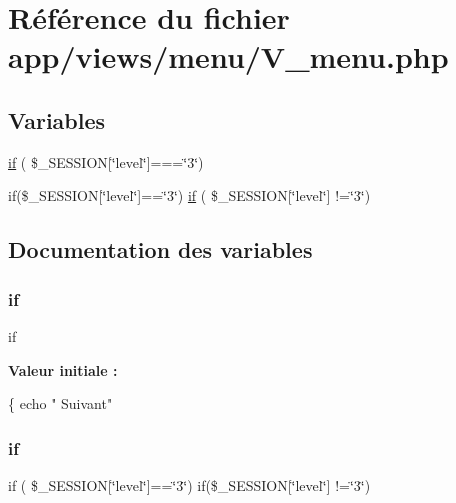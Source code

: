 \hypertarget{_v__menu_8php}{}\section{Référence du fichier app/views/menu/\+V\+\_\+menu.php}
\label{_v__menu_8php}
\subsection*{Variables}
\begin{DoxyCompactItemize}
\item 
\hyperlink{_v__menu_8php_aed100f8bb87599a4d812d99aee7072e0}{if} ( \$\+\_\+\+S\+E\+S\+S\+I\+ON\mbox{[}\char`\"{}level\char`\"{}\mbox{]}===\char`\"{}3\char`\"{})
\item 
if(\$\+\_\+\+S\+E\+S\+S\+I\+ON\mbox{[}\char`\"{}level\char`\"{}\mbox{]}==\char`\"{}3\char`\"{}) \hyperlink{_v__menu_8php_ac81b1d41ce3949361fdb64fac6891d95}{if} ( \$\+\_\+\+S\+E\+S\+S\+I\+ON\mbox{[}\char`\"{}level\char`\"{}\mbox{]} !=\char`\"{}3\char`\"{})
\end{DoxyCompactItemize}


\subsection{Documentation des variables}
\mbox{\label{_v__menu_8php_aed100f8bb87599a4d812d99aee7072e0}} 
\subsubsection{\texorpdfstring{if}{if}\hspace{0.1cm}{\footnotesize\ttfamily [1/2]}}
{\footnotesize\ttfamily if}

{\bfseries Valeur initiale \+:}
\begin{DoxyCode}
\{
                                echo \textcolor{stringliteral}{" Suivant"}
\end{DoxyCode}
\mbox{\label{_v__menu_8php_ac81b1d41ce3949361fdb64fac6891d95}} 
\subsubsection{\texorpdfstring{if}{if}\hspace{0.1cm}{\footnotesize\ttfamily [2/2]}}
{\footnotesize\ttfamily if ( \$\+\_\+\+S\+E\+S\+S\+I\+ON\mbox{[}\char`\"{}level\char`\"{}\mbox{]}==\char`\"{}3\char`\"{}) if(\$\+\_\+\+S\+E\+S\+S\+I\+ON\mbox{[}\char`\"{}level\char`\"{}\mbox{]} !=\char`\"{}3\char`\"{})}

